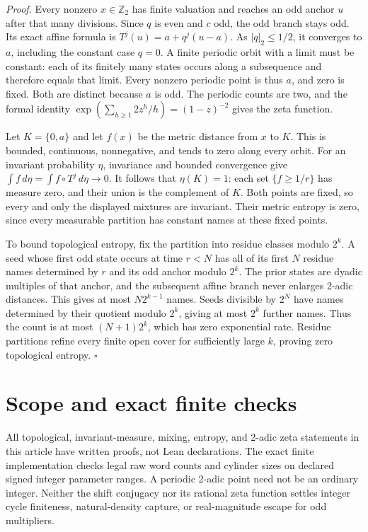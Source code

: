 \documentclass[11pt,letterpaper]{article}
\newcommand{\Z}{\mathbb{Z}}
\newenvironment{proof}{\noindent\textit{Proof.}}{\hfill\(\square\)}
\begin{document}
\begin{proof}
Every nonzero \(x\in\Z_2\) has finite valuation and reaches an odd
anchor \(u\) after that many divisions. Since \(q\) is even and
\(c\) odd, the odd branch stays odd. Its exact affine formula is
\(T^j(u)=a+q^j(u-a)\). As \(|q|_2\le1/2\), it converges to \(a\),
including the constant case \(q=0\). A finite periodic orbit with a
limit must be constant: each of its finitely many states occurs along
a subsequence and therefore equals that limit. Every nonzero periodic
point is thus \(a\), and zero is fixed. Both are distinct because
\(a\) is odd. The periodic counts are two, and the formal identity
\(\exp(\sum_{h\ge1}2z^h/h)=(1-z)^{-2}\) gives the zeta function.

Let \(K=\{0,a\}\) and let \(f(x)\) be the metric distance from \(x\)
to \(K\). This is bounded, continuous, nonnegative, and tends to zero
along every orbit. For an invariant probability \(\eta\), invariance
and bounded convergence give
\(\int f\,d\eta=\int f\circ T^j\,d\eta\to0\).
It follows that \(\eta(K)=1\): each set \(\{f\ge1/r\}\) has measure
zero, and their union is the complement of \(K\). Both points are
fixed, so every and only the displayed mixtures are invariant. Their
metric entropy is zero, since every measurable partition has constant
names at these fixed points.

To bound topological entropy, fix the partition into residue classes
modulo \(2^k\). A seed whose first odd state occurs at time \(r<N\)
has all of its first \(N\) residue names determined by \(r\) and its
odd anchor modulo \(2^k\). The prior states are dyadic multiples of
that anchor, and the subsequent affine branch never enlarges 2-adic
distances. This gives at most \(N2^{k-1}\) names. Seeds divisible by
\(2^N\) have names determined by their quotient modulo \(2^k\),
giving at most \(2^k\) further names. Thus the count is at most
\((N+1)2^k\), which has zero exponential rate. Residue partitions
refine every finite open cover for sufficiently large \(k\), proving
zero topological entropy.
\end{proof}

\section{Scope and exact finite checks}

All topological, invariant-measure, mixing, entropy, and 2-adic zeta
statements in this article have written proofs, not Lean declarations.
The exact finite implementation \cite{DyadicCode26} checks legal raw
word counts and cylinder sizes on declared signed integer parameter
ranges. A periodic 2-adic point need not be an ordinary integer.
Neither the shift conjugacy nor its rational zeta function settles
integer cycle finiteness, natural-density capture, or real-magnitude
escape for odd multipliers.



\end{document}

